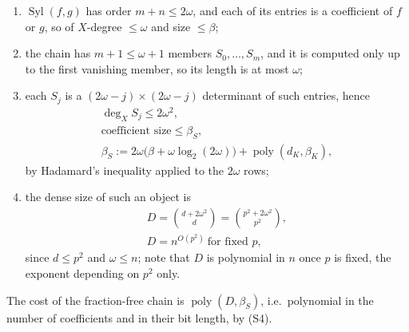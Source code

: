 \documentclass[journal]{IEEEtran}
\theoremstyle{plainn}
\theoremstyle{remark}
\newcommand{\poly}{\operatorname{poly}}
\begin{document}
\begin{enumerate}[label=(\alph*),leftmargin=*]
\item $\operatorname{Syl}(f,g)$ has order $m+n\le2\omega$, and each of its entries is a coefficient of
$f$ or $g$, so of $X$-degree $\le\omega$ and size $\le\beta$;
\item the chain has $m+1\le\omega+1$ members $S_0,\dots,S_m$, and it is computed only up to the first
vanishing member, so its length is at most $\omega$;
\item each $S_j$ is a $(2\omega-j)\times(2\omega-j)$ determinant of such entries, hence
\begin{equation}\label{appBC:eq:sizesout}
\begin{gathered}
\deg_X S_j\le2\omega^{2},\\
\text{coefficient size}\le\beta_S,\\
\beta_S:=2\omega\bigl(\beta+\omega\log_2(2\omega)\bigr)+\poly(d_K,\beta_K),
\end{gathered}
\end{equation}
by Hadamard's inequality applied to the $2\omega$ rows;
\item the dense size of such an object is
\begin{equation}\label{appBC:eq:dense}
\begin{gathered}
D=\binom{d+2\omega^{2}}{d}=\binom{p^{2}+2\omega^{2}}{p^{2}},\\
D=n^{O(p^{2})}\ \text{for fixed } p,
\end{gathered}
\end{equation}
since $d\le p^{2}$ and $\omega\le n$; note that $D$ is polynomial in $n$ once $p$ is fixed, the
exponent depending on $p^{2}$ only.
\end{enumerate}
The cost of the fraction-free chain is $\poly(D,\beta_S)$, i.e.\ polynomial in the number of
coefficients and in their bit length, by (S4).
\end{document}
